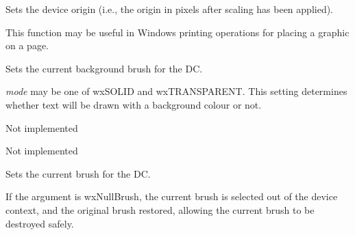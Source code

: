 
\label{wxsvgfiledcsetdeviceorigin}


Sets the device origin (i.e., the origin in pixels after scaling has been
applied).

This function may be useful in Windows printing
operations for placing a graphic on a page.

\label{wxsvgfiledcsetbackground}


Sets the current background brush for the DC.

\label{wxsvgfiledcsetbackgroundmode}


{\it mode} may be one of wxSOLID and wxTRANSPARENT. This setting determines
whether text will be drawn with a background colour or not.

\label{wxsvgfiledcsetclippingregion}





Not implemented 


\label{wxsvgfiledcsetpalette}


Not implemented 

\label{wxsvgfiledcsetbrush}


Sets the current brush for the DC.

If the argument is wxNullBrush, the current brush is selected out of the device
context, and the original brush restored, allowing the current brush to
be destroyed safely.

